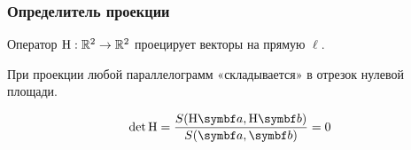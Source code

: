 \begin{frame}
\begin{center}





    \end{center}



\end{frame}




\begin{frame}
    \frametitle{Определитель проекции}


    Оператор $\mathrm{H}: \mathbb{R}^2 \to \mathbb{R}^2$ проецирует векторы на прямую $\ell$.  



    \pause

    При проекции любой параллелограмм «складывается» в отрезок нулевой площади.


    \[
    \det \HH = \frac{S(\HH \ba, \HH \bb )}{S(\ba, \bb )} = 0     
    \]

\end{frame}




